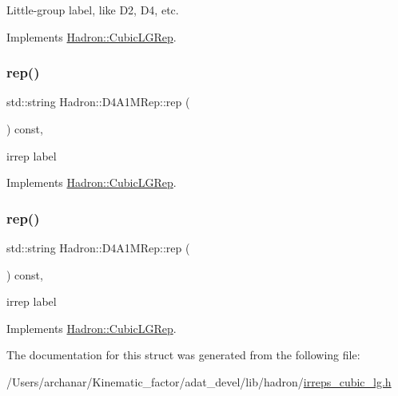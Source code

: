 Little-\/group label, like D2, D4, etc. 

Implements \mbox{\hyperlink{structHadron_1_1CubicLGRep_a9bdb14b519a611d21379ed96a3a9eb41}{Hadron\+::\+Cubic\+L\+G\+Rep}}.

\mbox{\label{structHadron_1_1D4A1MRep_adbca586cc67ec998e597be4d2e251c8d}} 
\subsubsection{\texorpdfstring{rep()}{rep()}\hspace{0.1cm}{\footnotesize\ttfamily [1/2]}}
{\footnotesize\ttfamily std\+::string Hadron\+::\+D4\+A1\+M\+Rep\+::rep (\begin{DoxyParamCaption}{ }\end{DoxyParamCaption}) const\hspace{0.3cm}{\ttfamily [inline]}, {\ttfamily [virtual]}}

irrep label 

Implements \mbox{\hyperlink{structHadron_1_1CubicLGRep_a50f5ddbb8f4be4cee0106fa9e8c75e6c}{Hadron\+::\+Cubic\+L\+G\+Rep}}.

\mbox{\label{structHadron_1_1D4A1MRep_adbca586cc67ec998e597be4d2e251c8d}} 
\subsubsection{\texorpdfstring{rep()}{rep()}\hspace{0.1cm}{\footnotesize\ttfamily [2/2]}}
{\footnotesize\ttfamily std\+::string Hadron\+::\+D4\+A1\+M\+Rep\+::rep (\begin{DoxyParamCaption}{ }\end{DoxyParamCaption}) const\hspace{0.3cm}{\ttfamily [inline]}, {\ttfamily [virtual]}}

irrep label 

Implements \mbox{\hyperlink{structHadron_1_1CubicLGRep_a50f5ddbb8f4be4cee0106fa9e8c75e6c}{Hadron\+::\+Cubic\+L\+G\+Rep}}.



The documentation for this struct was generated from the following file\+:\begin{DoxyCompactItemize}
\item 
/\+Users/archanar/\+Kinematic\+\_\+factor/adat\+\_\+devel/lib/hadron/\mbox{\hyperlink{lib_2hadron_2irreps__cubic__lg_8h}{irreps\+\_\+cubic\+\_\+lg.\+h}}\end{DoxyCompactItemize}
